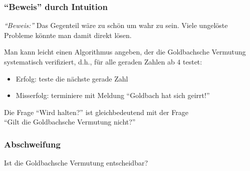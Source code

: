\documentclass[aspectratio=1610,onlymath]{beamer}
\begin{document}
\begin{frame}[t]\frametitle{"`Beweis"' durch Intuition}

\pause

\emph{"`Beweis:"'} Das Gegenteil wäre zu schön um wahr zu sein. Viele ungelöste Probleme
könnte man damit direkt lösen.\bigskip\pause

\pause

Man kann leicht einen Algorithmus  angeben, der die Goldbachsche Vermutung systematisch verifiziert, d.h., für alle geraden Zahlen ab $4$ testet:
\begin{itemize}
\item Erfolg: teste die nächste gerade Zahl
\item Misserfolg: terminiere mit Meldung "`Goldbach hat sich geirrt!"'
\end{itemize}

Die Frage "`Wird  halten?"' ist gleichbedeutend mit der Frage\\"`Gilt die Goldbachsche Vermutung nicht?"'

\end{frame}

\begin{frame}\frametitle{Abschweifung}

\begin{center}
\large Ist die Goldbachsche Vermutung entscheidbar?
\end{center}

\end{frame}
\end{document}
